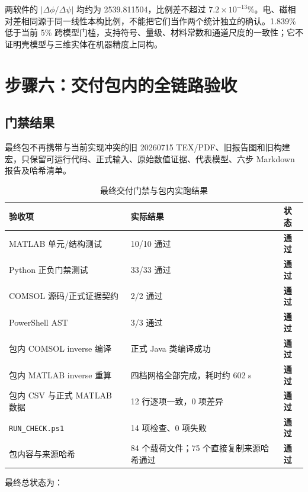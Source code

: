 \documentclass[UTF8,fontset=windows,12pt,a4paper]{ctexart}
\newcommand{\pass}{\textcolor{auditgreen}{\textbf{通过}}}
\begin{document}
两软件的 $|\Delta\phi/\Delta\psi|$ 均约为 2539.811504，比例差不超过 $7.2\times10^{-13}\%$。电、磁相对差相同源于同一线性本构比例，不能把它们当作两个统计独立的确认。1.839\% 低于当前 5\% 跨模型门槛，支持符号、量级、材料常数和通道尺度的一致性；它不证明壳模型与三维实体在机器精度上同构。

\section{步骤六：交付包内的全链路验收}

\subsection{门禁结果}

最终包不再携带与当前实现冲突的旧 20260715 TEX/PDF、旧报告图和旧构建宏，只保留可运行代码、正式输入、原始数值证据、代表模型、六步 Markdown 报告及哈希清单。

\begin{table}[H]
\centering
\caption{最终交付门禁与包内实跑结果}
\label{tab:delivery-gates}
\small
\begin{tabularx}{\textwidth}{p{}Yp{0.13\textwidth}}
\toprule
验收项 & 实际结果 & 状态 \\
\midrule
MATLAB 单元/结构测试 & 10/10 通过 & \pass \\
Python 正负门禁测试 & 33/33 通过 & \pass \\
COMSOL 源码/正式证据契约 & 2/2 通过 & \pass \\
PowerShell AST & 3/3 通过 & \pass \\
包内 COMSOL inverse 编译 & 正式 Java 类编译成功 & \pass \\
包内 MATLAB inverse 重算 & 四档网格全部完成，耗时约 602 s & \pass \\
包内 CSV 与正式 MATLAB 数据 & 12 行逐项一致，0 项差异 & \pass \\
\texttt{RUN\_CHECK.ps1} & 14 项检查、0 项失败 & \pass \\
包内容与来源哈希 & 84 个载荷文件；75 个直接复制来源哈希通过 & \pass \\
\bottomrule
\end{tabularx}
\end{table}

最终总状态为：

\begin{center}
\end{center}
\end{document}
